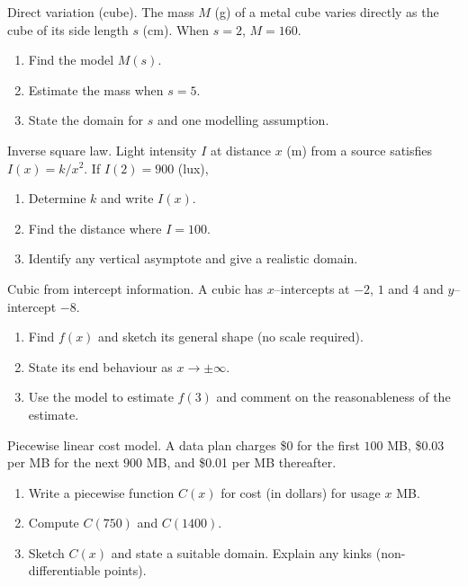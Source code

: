 \documentclass[11pt]{article}
\def\textbf#1{#1}%
\newcounter{question}
\begin{document}
\begin{question}
\textbf{Direct variation (cube).}
The mass $M$ (g) of a metal cube varies directly as the cube of its side length $s$ (cm). When $s=2$, $M=160$.
\begin{enumerate}
  \item Find the model $M(s)$.
  \item Estimate the mass when $s=5$.
  \item State the domain for $s$ and one modelling assumption.
\end{enumerate}
\end{question}

\begin{question}
\textbf{Inverse square law.}
Light intensity $I$ at distance $x$ (m) from a source satisfies $I(x)=k/x^2$. If $I(2)=900$ (lux),
\begin{enumerate}
  \item Determine $k$ and write $I(x)$.
  \item Find the distance where $I=100$.
  \item Identify any vertical asymptote and give a realistic domain.
\end{enumerate}
\end{question}

\begin{question}
\textbf{Cubic from intercept information.}
A cubic has $x$–intercepts at $-2$, $1$ and $4$ and $y$–intercept $-8$.
\begin{enumerate}
  \item Find $f(x)$ and sketch its general shape (no scale required).
  \item State its end behaviour as $x\to\pm\infty$.
  \item Use the model to estimate $f(3)$ and comment on the reasonableness of the estimate.
\end{enumerate}
\end{question}

\begin{question}
\textbf{Piecewise linear cost model.}
A data plan charges \$0 for the first $100$ MB, \$0.03 per MB for the next $900$ MB, and \$0.01 per MB thereafter.
\begin{enumerate}
  \item Write a piecewise function $C(x)$ for cost (in dollars) for usage $x$ MB.
  \item Compute $C(750)$ and $C(1400)$.
  \item Sketch $C(x)$ and state a suitable domain. Explain any kinks (non-differentiable points).
\end{enumerate}
\end{question}
\end{document}
